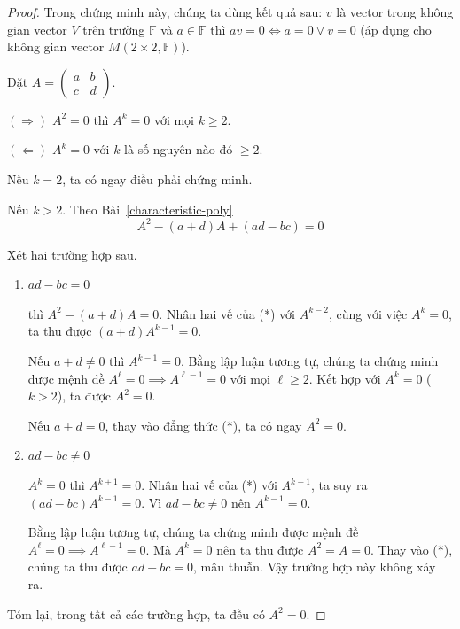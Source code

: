 \begin{proof}
    Trong chứng minh này, chúng ta dùng kết quả sau: $v$ là vector trong không gian vector $V$ trên trường $\mathbb{F}$ và $a\in \mathbb{F}$ thì $av = 0 \Longleftrightarrow a = 0 \lor v = 0$ (áp dụng cho không gian vector $M(2\times 2, \mathbb{F})$).
    
    Đặt $A = \begin{pmatrix}a & b \\ c & d\end{pmatrix}$.
    
    $(\Rightarrow)$ $A^{2} = 0$ thì $A^{k} = 0$ với mọi $k\ge 2$.
    
    $(\Leftarrow)$ $A^{k} = 0$ với $k$ là số nguyên nào đó $\geq 2$.
    
    Nếu $k = 2$, ta có ngay điều phải chứng minh.
    
    Nếu $k > 2$. Theo Bài~\ref{characteristic-poly}
    \[
        A^{2} - (a+d)A + (ad - bc) = 0\tag{*}
    \]

    Xét hai trường hợp sau.
    \begin{enumerate}[label={Trường hợp \arabic*.},itemindent=2.5cm]
        \item $ad - bc = 0$

              thì $A^{2} - (a + d)A = 0$. Nhân hai vế của (*) với $A^{k-2}$, cùng với việc $A^{k} = 0$, ta thu được $(a + d)A^{k-1} = 0$.

              Nếu $a + d\ne 0$ thì $A^{k-1} = 0$. Bằng lập luận tương tự, chúng ta chứng minh được mệnh đề $A^{\ell} = 0\implies A^{\ell-1} = 0$ với mọi $\ell\geq 2$. Kết hợp với $A^{k} = 0$ ($k > 2$), ta được $A^{2} = 0$.

              Nếu $a + d = 0$, thay vào đẳng thức (*), ta có ngay $A^{2} = 0$.
        \item $ad - bc \ne 0$

              $A^{k} = 0$ thì $A^{k+1} = 0$. Nhân hai vế của (*) với $A^{k-1}$, ta suy ra $(ad - bc)A^{k-1} = 0$. Vì $ad - bc\ne 0$ nên $A^{k-1} = 0$.

               Bằng lập luận tương tự, chúng ta chứng minh được mệnh đề $A^{\ell} = 0\implies A^{\ell-1} = 0$. Mà $A^{k} = 0$ nên ta thu được $A^{2} = A = 0$. Thay vào (*), chúng ta thu được $ad - bc = 0$, mâu thuẫn. Vậy trường hợp này không xảy ra.
    \end{enumerate}
    
    Tóm lại, trong tất cả các trường hợp, ta đều có $A^{2} = 0$.
\end{proof}

